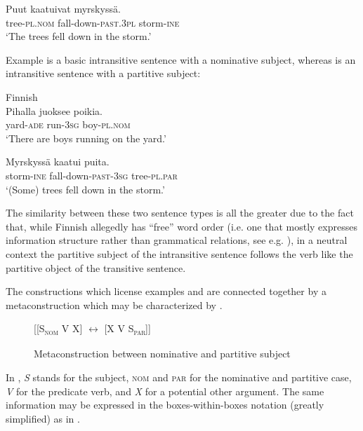\documentclass[output=paper, colorlinks,citecolor=brown]{langsci/langscibook}
\begin{document}
\ex\label{ex:leino_4b}
\gll Puut               kaatuivat                  myrskyssä.\\
     tree-\textsc{pl.nom}  fall-down-\textsc{past.3pl}  storm-\textsc{ine}\\
\glt `The trees fell down in the storm.'
\z
\z

Example  is a basic intransitive sentence with a nominative subject, where\-as   is an intransitive sentence with a partitive subject:

\ea\label{ex:leino_5}
{Finnish}\\
\ea
\gll Pihalla      juoksee  poikia.\\
     yard-\textsc{ade}  run\textsc{{}-3sg}  boy-\textsc{pl.nom}\\
\glt `There are boys running on the yard.'\label{ex:leino_5a}


\ex \label{ex:leino_5b}
\gll Myrskyssä  kaatui                        puita.\\
     storm-\textsc{ine}   fall-down-\textsc{past-3sg}  tree-\textsc{pl.par}\\
\glt `(Some) trees fell down in the storm.'
\z
\z


The similarity between these two sentence types is all the greater due to the fact that, while Finnish allegedly has “free” word order (i.e. one that mostly expresses information structure rather than grammatical relations, see e.g. \citealt{Vilkuna1989}), in a neutral context the partitive subject of the intransitive sentence follows the verb like the partitive object of the transitive sentence.

The constructions which license examples  and  are connected together by a metaconstruction which may be characterized by .

\begin{figure}{}
     [[S\textsc{\textsubscript{nom}} V X] $\leftrightarrow $ [X V S\textsc{\textsubscript{par}}]]
    \caption{Metaconstruction between nominative and partitive subject}
    \label{fig:leino_fig3}
\end{figure}

In , \textit{S} stands for the subject, \textsc{nom} and \textsc{par} for the nominative and partitive case, \textit{V} for the predicate verb, and \textit{X} for a potential other argument. The same information may be expressed in the boxes-within-boxes notation (greatly simplified) as in . 
\end{document}
